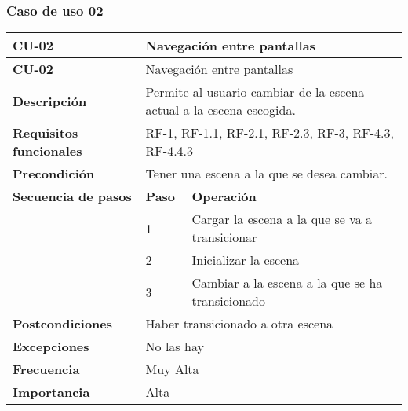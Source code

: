 \subsubsection{Caso de uso 02}
\begin{longtable}{lll}
\textbf{CU-02}                                 & \multicolumn{2}{l}{Navegación entre pantallas}                                           \\ \hline
\endfirsthead
\textbf{CU-02}                                 & \multicolumn{2}{l}{Navegación entre pantallas}                                           \\ \hline
\endhead
%
\textbf{Descripción}                             & \multicolumn{2}{l}{Permite al usuario cambiar de la escena actual a la escena escogida.} \\ \hline
\textbf{Requisitos funcionales}                  & \multicolumn{2}{l}{RF-1, RF-1.1, RF-2.1, RF-2.3, RF-3, RF-4.3, RF-4.4.3}                                                         \\ \hline
\textbf{Precondición}                            & \multicolumn{2}{l}{Tener una escena a la que se desea cambiar.}                          \\ \hline
\multicolumn{1}{l|}{\textbf{Secuencia de pasos}} & \textbf{Paso}             & \textbf{Operación}                                           \\ \cline{2-3} 
\multicolumn{1}{l|}{}                            & 1                         & Cargar la escena a la que se va a transicionar               \\
\multicolumn{1}{l|}{}                            & 2                         & Inicializar la escena                                        \\
\multicolumn{1}{l|}{}                            & 3                         & Cambiar a la escena a la que se ha transicionado             \\ \hline
\textbf{Postcondiciones}                         & \multicolumn{2}{l}{Haber transicionado a otra escena}                                    \\ \hline
\textbf{Excepciones}                             & \multicolumn{2}{l}{No las hay}                                                           \\ \hline
\textbf{Frecuencia}                              & \multicolumn{2}{l}{Muy Alta}                                                             \\ \hline
\textbf{Importancia}                             & \multicolumn{2}{l}{Alta}                                                                 \\ \hline
\end{longtable}

